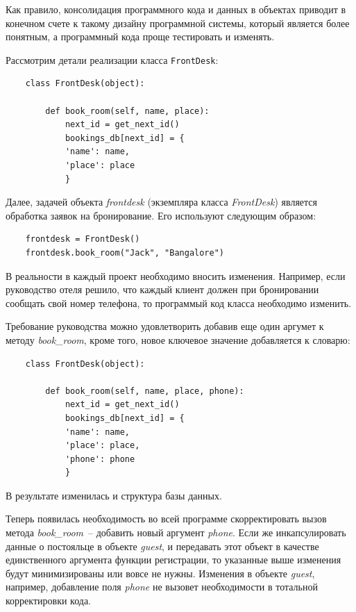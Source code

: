 \documentclass[a4paper,openany,twoside,final]{book}
\providecommand*{\DUroletitlereference}[1]{\textsl{#1}}
\begin{document}
Как правило, консолидация программного кода и данных в объектах приводит в конечном счете к такому дизайну программной системы, который является более понятным, а программный кода проще тестировать и изменять.

Рассмотрим детали реализации класса \texttt{FrontDesk}:

\begin{verbatim}
    class FrontDesk(object):

        def book_room(self, name, place):
            next_id = get_next_id()
            bookings_db[next_id] = {
            'name': name,
            'place': place
            }
\end{verbatim}

Далее, задачей объекта \DUroletitlereference{frontdesk} (экземпляра класса \DUroletitlereference{FrontDesk}) является обработка заявок на бронирование.  Его используют следующим образом:

\begin{verbatim}
    frontdesk = FrontDesk()
    frontdesk.book_room("Jack", "Bangalore")
\end{verbatim}

В реальности в каждый проект необходимо вносить изменения.  Например, если руководство отеля решило, что каждый клиент должен при бронировании сообщать свой номер телефона, то программый код класса необходимо изменить.

Требование руководства можно удовлетворить добавив еще один аргумет к методу \DUroletitlereference{book\_room}, кроме того, новое ключевое значение добавляется к словарю:

\begin{verbatim}
    class FrontDesk(object):

        def book_room(self, name, place, phone):
            next_id = get_next_id()
            bookings_db[next_id] = {
            'name': name,
            'place': place,
            'phone': phone
            }
\end{verbatim}

В результате изменилась и структура базы данных.

Теперь появилась необходимость во всей программе скорректировать вызов метода \DUroletitlereference{book\_room}~-- добавить новый аргумент \DUroletitlereference{phone}.  Если же инкапсулировать данные о постояльце в объекте \DUroletitlereference{guest}, и передавать этот объект в качестве единственного аргумента функции регистрации, то указанные выше изменения будут минимизированы или вовсе не нужны.  Изменения в объекте \DUroletitlereference{guest}, например, добавление поля \DUroletitlereference{phone} не вызовет необходимости в тотальной корректировки кода.
\end{document}
